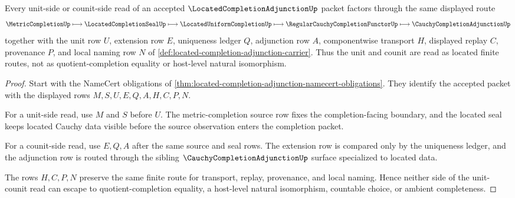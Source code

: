 \begin{theorem}
\label{thm:located-completion-adjunction-unit-counit}
Every unit-side or counit-side read of an accepted $\LocatedCompletionAdjunctionUp$ packet factors through the same displayed route
$$
\MetricCompletionUp \longmapsto \LocatedCompletionSealUp \longmapsto \LocatedUniformCompletionUp \longmapsto \RegularCauchyCompletionFunctorUp \longmapsto \CauchyCompletionAdjunctionUp
$$
together with the unit row $U$, extension row $E$, uniqueness ledger $Q$, adjunction row $A$, componentwise transport $H$, displayed replay $C$, provenance $P$, and local naming row $N$ of \autoref{def:located-completion-adjunction-carrier}. Thus the unit and counit are read as located finite routes, not as quotient-completion equality or host-level natural isomorphism.
\end{theorem}
\begin{proof}
Start with the NameCert obligations of \autoref{thm:located-completion-adjunction-namecert-obligations}. They identify the accepted packet with the displayed rows $M,S,U,E,Q,A,H,C,P,N$.

For a unit-side read, use $M$ and $S$ before $U$. The metric-completion source row fixes the completion-facing boundary, and the located seal keeps located Cauchy data visible before the source observation enters the completion packet.

For a counit-side read, use $E,Q,A$ after the same source and seal rows. The extension row is compared only by the uniqueness ledger, and the adjunction row is routed through the sibling $\CauchyCompletionAdjunctionUp$ surface specialized to located data.

The rows $H,C,P,N$ preserve the same finite route for transport, replay, provenance, and local naming. Hence neither side of the unit-counit read can escape to quotient-completion equality, a host-level natural isomorphism, countable choice, or ambient completeness.
\end{proof}


